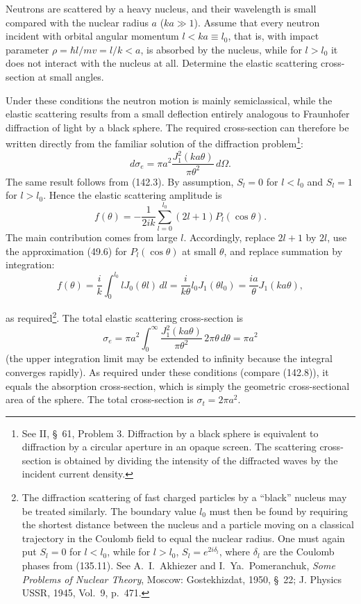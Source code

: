 \ProblemHeading

Neutrons are scattered by a heavy nucleus, and their wavelength is small
compared with the nuclear radius $a$ ($ka\gg1$). Assume that every neutron
incident with orbital angular momentum $l<ka\equiv l_0$, that is, with impact
parameter $\rho=\hbar l/mv=l/k<a$, is absorbed by the nucleus, while for
$l>l_0$ it does not interact with the nucleus at all. Determine the elastic
scattering cross-section at small angles.

\SolutionHeading
Under these conditions the neutron motion is mainly semiclassical, while the
elastic scattering results from a small deflection entirely analogous to
Fraunhofer diffraction of light by a black sphere. The required cross-section
can therefore be written directly from the familiar solution of the
diffraction problem\footnote{See II, \S~61, Problem 3. Diffraction by a black
sphere is equivalent to diffraction by a circular aperture in an opaque
screen. The scattering cross-section is obtained by dividing the intensity
of the diffracted waves by the incident current density.}:
\[
 d\sigma_e=\pi a^2\frac{J_1^2(ka\theta)}{\pi\theta^2}\,d\Omega.
\]
The same result follows from (142.3). By assumption, $S_l=0$ for $l<l_0$ and
$S_l=1$ for $l>l_0$. Hence the elastic scattering amplitude is
\[
 f(\theta)=-\frac1{2ik}\sum_{l=0}^{l_0}(2l+1)P_l(\cos\theta).
\]
The main contribution comes from large $l$. Accordingly, replace $2l+1$ by
$2l$, use the approximation (49.6) for $P_l(\cos\theta)$ at small $\theta$,
and replace summation by integration:
\[
 f(\theta)=\frac{i}{k}\int_0^{l_0}lJ_0(\theta l)\,dl
 =\frac{i}{k\theta}l_0J_1(\theta l_0)
 =\frac{ia}{\theta}J_1(ka\theta),
\]

as required\footnote{The diffraction scattering of fast charged particles by
a ``black'' nucleus may be treated similarly. The boundary value $l_0$ must
then be found by requiring the shortest distance between the nucleus and a
particle moving on a classical trajectory in the Coulomb field to equal the
nuclear radius. One must again put $S_l=0$ for $l<l_0$, while for $l>l_0$,
$S_l=e^{2i\delta_l}$, where $\delta_l$ are the Coulomb phases from (135.11).
See A.~I.~Akhiezer and I.~Ya.~Pomeranchuk, \emph{Some Problems of Nuclear
Theory}, Moscow: Gostekhizdat, 1950, \S~22; J. Physics USSR, 1945, Vol.~9,
p.~471.}. The total elastic scattering cross-section is
\[
 \sigma_e=\pi a^2\int_0^\infty\frac{J_1^2(ka\theta)}{\pi\theta^2}
 \,2\pi\theta\,d\theta=\pi a^2
\]
(the upper integration limit may be extended to infinity because the integral
converges rapidly). As required under these conditions (compare (142.8)), it
equals the absorption cross-section, which is simply the geometric
cross-sectional area of the sphere. The total cross-section is
$\sigma_t=2\pi a^2$.

